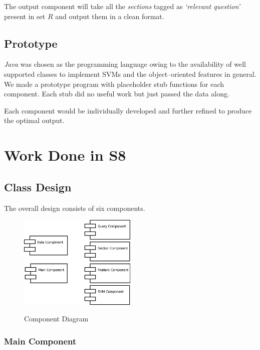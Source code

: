 \documentclass[a4paper,10pt]{report}
\begin{document}
The output component will take all the \emph{sections} tagged as \emph{`relevant question'} present in set $R$ and output them in a clean format.

\chapter{Prototype}

\emph{Java} was chosen as the programming language owing to the availability of well supported classes to implement SVMs and the object--oriented features in general.\\

\noindent We made a prototype program with placeholder stub functions for each component. Each stub did no useful work but just passed the data along.

Each component would be individually developed and further refined to produce the optimal output.


\part{Work Done in S8}

\chapter{Class Design}

The overall design consists of six components. \\

\begin{figure}[h!]
\centering
\includegraphics[width=0.50\textwidth]{./diagrams/Component}\\
\caption{Component Diagram}
\end{figure}

\clearpage


\section{Main Component}
\end{document}
